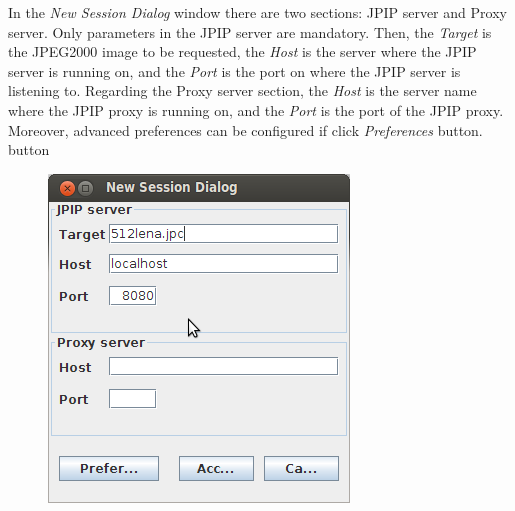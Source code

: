 \documentclass[a4paper,10pt]{article}
\begin{document}
In the \emph{New Session Dialog} window there are two sections: JPIP server and
Proxy server. Only parameters in the JPIP server are mandatory. Then, the
\emph{Target} is the JPEG2000 image to be requested, the \emph{Host} is the 
server where the JPIP server is running on, and the \emph{Port} is the port on where
the JPIP server is listening to. Regarding the Proxy server section, the 
\emph{Host} is the server name where the JPIP proxy is running on, and the
\emph{Port} is the port of the JPIP proxy. Moreover, advanced preferences
can be configured if click \emph{Preferences} button.
button 
\begin{figure}[!h]
	\centering
	\includegraphics[scale=0.4]{images/CADIViewer-screenshot-NewSessionDialog.png} \\
\end{figure}
\vspace*{0.5cm}
\end{document}
